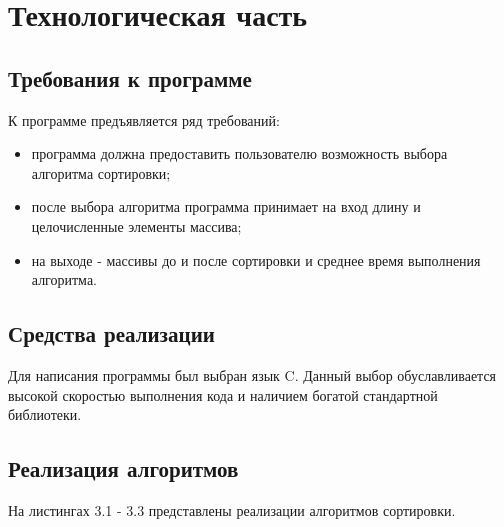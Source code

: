 \chapter{Технологическая часть}

\section{Требования к программе}

К программе предъявляется ряд требований:

\begin{itemize}
	\item программа должна предоставить пользователю возможность выбора алгоритма сортировки;
	\item после выбора алгоритма программа принимает на вход длину и целочисленные элементы массива;
	\item на выходе - массивы до и после сортировки и среднее время выполнения алгоритма.
\end{itemize}

\section{Средства реализации}

Для написания программы был выбран язык C. Данный выбор обуславливается высокой скоростью выполнения кода и наличием богатой стандартной библиотеки.

\section{Реализация алгоритмов}

На листингах 3.1 - 3.3 представлены реализации алгоритмов сортировки.

